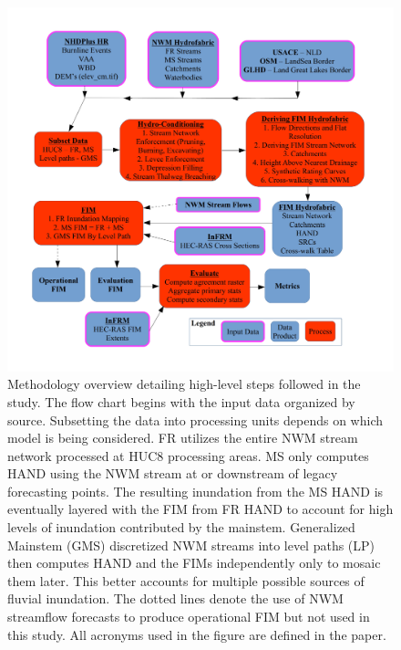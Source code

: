 \documentclass[draft]{dependencies/agujournal2019}
\begin{document}
\begin{figure}[H]
\centering
\includegraphics[scale=6.0]{figures/methods_overview.jpg}
\caption{
Methodology overview detailing high-level steps followed in the study.
The flow chart begins with the input data organized by source.
Subsetting the data into processing units depends on which model is being considered.
FR utilizes the entire NWM stream network processed at HUC8 processing areas.
MS only computes HAND using the NWM stream at or downstream of legacy forecasting points.
The resulting inundation from the MS HAND is eventually layered with the FIM from FR HAND to account for high levels of inundation contributed by the mainstem.
Generalized Mainstem (GMS) discretized NWM streams into level paths (LP) then computes HAND and the FIMs independently only to mosaic them later. 
This better accounts for multiple possible sources of fluvial inundation.
The dotted lines denote the use of NWM streamflow forecasts to produce operational FIM but not used in this study.
All acronyms used in the figure are defined in the paper.
}
\label{fig:methods_overview}
\end{figure}
%
%
\end{document}
